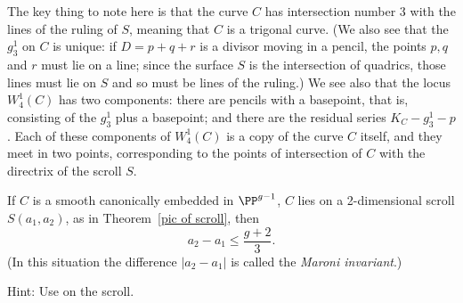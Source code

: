 \begin{exercise}
The key thing to note here is that the curve $C$ has intersection number
3 with the lines of the ruling of $S$, meaning that $C$ is a trigonal
curve. (We also see that the $g^1_3$ on $C$ is unique: if $D = p +
q + r$ is a divisor moving in a pencil, the points $p, q$ and $r$ must
lie on a line; since the surface $S$ is the intersection of quadrics,
those lines must lie on $S$ and so must be  lines  of the ruling.) We
see also that the locus $W^1_4(C)$ has two components: there are pencils
with a basepoint, that is, consisting of the $g^1_3$ plus a basepoint;
and there are the residual series $K_C - g^1_3 - p$. Each of these
components of $W^1_4(C)$ is a copy of the curve $C$ itself, and they
meet in two points, corresponding to the points of intersection of $C$
with the directrix of the scroll $S$.
\end{exercise}

\begin{exercise}\label{Maroni Bound}
If $C$ is a smooth 
%
canonically embedded in $\PP^{g-1}$,
$C$ lies on a 2-dimensional scroll $S(a_1, a_2)$, as in
Theorem~\ref{pic of scroll},
then
$$
a_2-a_1\leq \frac{g+2}{3}.
$$
(In this situation the difference $|a_2-a_1|$ is called the 
%
\emph{Maroni invariant}.)

Hint: Use 
on the scroll.
%
%
\end{exercise}



